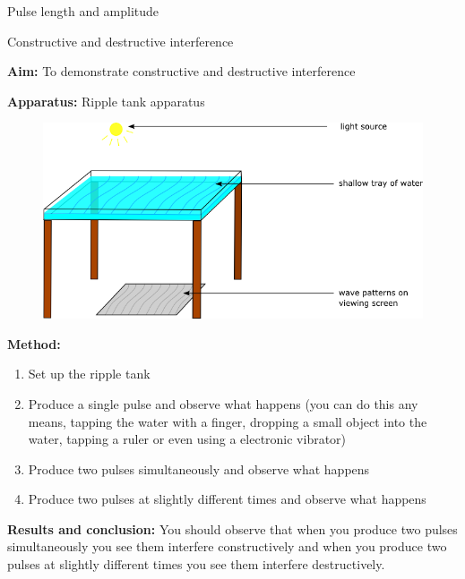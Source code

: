 \begin{Investigation}{Pulse length and amplitude }
	
\par
\label{m38802*eip-791}
\begin{g_experiment}{Constructive and destructive interference}

\textbf{Aim:} To demonstrate constructive and destructive interference
\par 
\label{m38802*eip7241}\noindent{}\textbf{Apparatus: } 
Ripple tank apparatus
    \setcounter{subfigure}{0}
	\begin{figure}[H] %
    \begin{center}
    \label{m38802*id63458!!!underscore!!!media}\label{m38802*id63458!!!underscore!!!printimage}\includegraphics[width=0.8\columnwidth]{col11305.imgs/m38802_rippletray.png} %
    \end{center}
 \end{figure}       \par 
\label{m38802*eip7474}\noindent{}\textbf{Method:}
\label{m38802*id6242}\begin{enumerate}[noitemsep, label=\textbf{\arabic*}. ] 
            \item Set up the ripple tank	
	    \item Produce a single pulse and observe what happens (you can do this any means, tapping the water with a finger, dropping a small object into the water, tapping a ruler or even using a electronic vibrator)
	  \item Produce two pulses simultaneously and observe what happens
	  \item Produce two pulses at slightly different times and observe what happens\end{enumerate}
\par 
\label{m38802*id614134}\noindent{}\textbf{Results and conclusion:} You should observe that when you produce two pulses simultaneously you see them interfere constructively and when you produce two pulses at slightly different times you see them interfere destructively.
\par \label{m38802*secfhsst!!!underscore!!!id636}
\end{g_experiment}



\end{Investigation}
